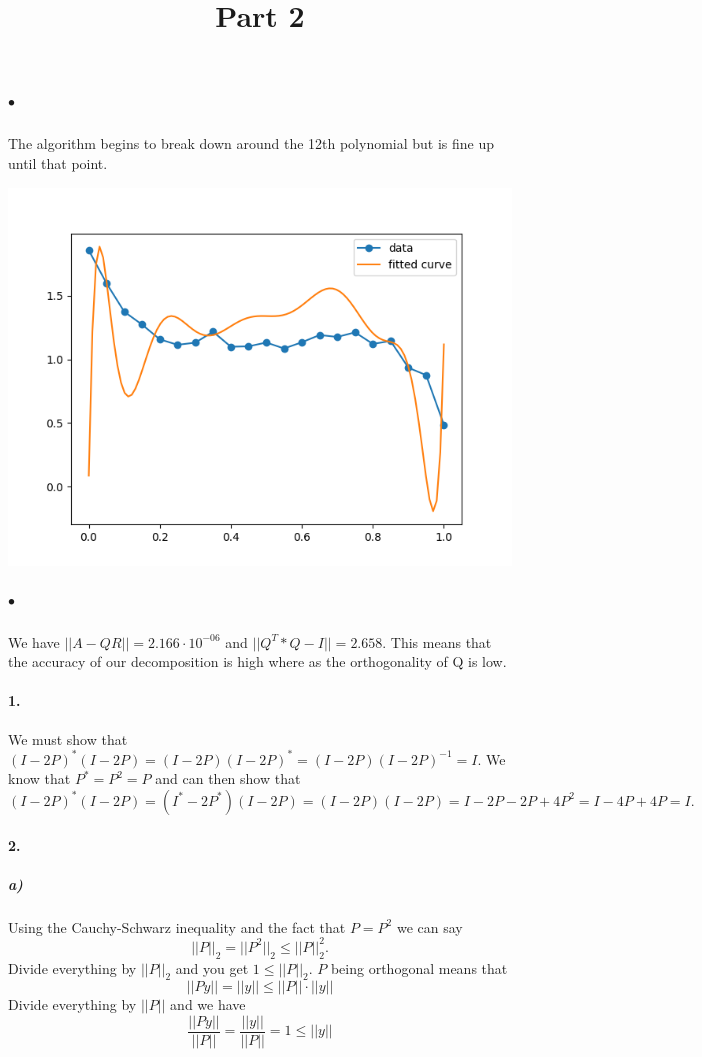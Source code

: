\documentclass[12pt]{article}
\begin{document}
	\subparagraph{$\bullet$}
		The algorithm begins to break down around the 12th polynomial but is fine up until that point. 
		
		\includegraphics[scale=0.7]{Figure_5}
		
	\subparagraph{$\bullet$}
		We have $||A - QR|| = 2.166\cdot10^{-06}$ and $||Q^T*Q - I|| = 2.658$. This means that the accuracy of our decomposition is high where as the orthogonality of Q is low.
		
		

\newpage	
\title{\textbf{Part 2}}


\paragraph{1.}
	We must show that $(I-2P)^*(I-2P) = (I-2P)(I-2P)^* = (I-2P)(I-2P)^{-1} = I$. We know that $P^* = P^2 = P$ and can then show that
	\[
	(I-2P)^*(I-2P) = (I^*-2P^*)(I-2P) = (I-2P)(I-2P) = I - 2P - 2P + 4P^2 = I - 4P + 4P = I.
	\]
	
\paragraph{2.}
	\subparagraph{a)}
		Using the Cauchy-Schwarz inequality and the fact that $P = P^2$ we can say
		\[
		||P||_2 = ||P^2||_2 \le ||P||^2_2.
		\]
		Divide everything by $||P||_2$ and you get $1 \le ||P||_2$. $P$ being orthogonal means that
		\[
		||Py|| = ||y|| \le ||P||\cdot||y||	
		\]
		Divide everything by $||P||$ and we have
		\[
		\frac{||Py||}{||P||} = \frac{||y||}{||P||} = 1 \le ||y||
		\]
				
\end{document}
